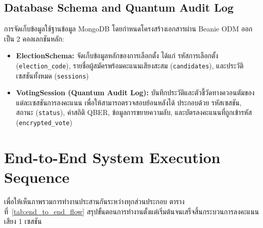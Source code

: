 \subsection{Database Schema and Quantum Audit Log}
การจัดเก็บข้อมูลใช้ฐานข้อมูล MongoDB โดยกำหนดโครงสร้างเอกสารผ่าน Beanie ODM ออกเป็น 2 คอลเลกชันหลัก:
\begin{itemize}
    \item \textbf{ElectionSchema:} จัดเก็บข้อมูลหลักของการเลือกตั้ง ได้แก่ รหัสการเลือกตั้ง (\texttt{election\_code}), รายชื่อผู้สมัครพร้อมคะแนนเสียงสะสม (\texttt{candidates}), และประวัติเซสชันทั้งหมด (\texttt{sessions})
    \item \textbf{VotingSession (Quantum Audit Log):} บันทึกประวัติและตัวชี้วัดทางควอนตัมของแต่ละเซสชันการลงคะแนน เพื่อให้สามารถตรวจสอบย้อนหลังได้ ประกอบด้วย รหัสเซสชัน, สถานะ (\texttt{status}), ค่าสถิติ QBER, ข้อมูลการขยายความลับ, และบัตรลงคะแนนที่ถูกเข้ารหัส (\texttt{encrypted\_vote})
\end{itemize}

\section{End-to-End System Execution Sequence}
เพื่อให้เห็นภาพรวมการทำงานประสานกันระหว่างทุกส่วนประกอบ ตารางที่~\ref{tab:end_to_end_flow} สรุปขั้นตอนการทำงานตั้งแต่เริ่มต้นจนเสร็จสิ้นกระบวนการลงคะแนนเสียง 1 เซสชัน

